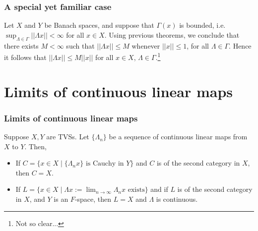 \documentclass{beamer}
\begin{document}
\begin{frame}
\frametitle{A special yet familiar case}

Let $X$ and $Y$ be Banach spaces, and suppose that $\Gamma(x)$ is bounded, i.e. $\sup_{\Lambda\in\Gamma}||\Lambda x|| < \infty$ for all $x \in X$. Using previous theorems, we conclude that there exists $M < \infty$ such that $||\Lambda x|| \leq M$ whenever $||x|| \leq 1$, for all $\Lambda \in \Gamma$. Hence it follows that $||\Lambda x|| \leq M||x||$ for all $x\in X$, $\Lambda \in \Gamma$.\footnote{Not so clear...}

\end{frame}


\section{Limits of continuous linear maps}
\begin{frame}
\frametitle{Limits of continuous linear maps}

\begin{theorem}Suppose $X,Y$ are TVSs. Let $\{\Lambda_n\}$ be a sequence of continuous linear maps from $X$ to $Y$. Then,\begin{itemize}
    \item If $C = \{x\in X\mid \{\Lambda_n x\}\text{ is Cauchy in }Y\}$ and $C$ is of the second category in $X$, then $C = X$.
    \item If $L = \{x \in X \mid \Lambda x := \lim_{n\to \infty}\Lambda_n x \text{ exists}\}$ and if $L$ is of the second category in $X$, and $Y$ is an $F$-space, then $L = X$ and $\Lambda$ is continuous.
\end{itemize}
\end{theorem}
\end{frame}
\end{document}
